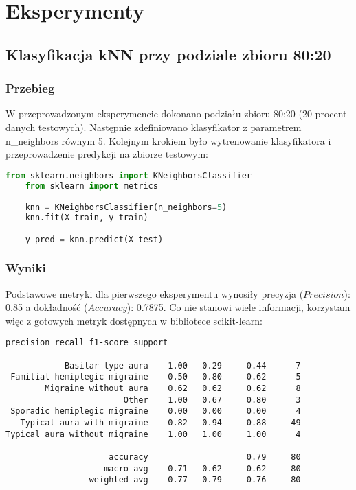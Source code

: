 \section{Eksperymenty}
\subsection{Klasyfikacja kNN przy podziale zbioru 80:20}
\subsubsection{Przebieg}
W przeprowadzonym eksperymencie dokonano podziału zbioru 80:20 (20 procent danych testowych). Następnie zdefiniowano klasyfikator z parametrem n\_neighbors równym 5. Kolejnym krokiem było wytrenowanie klasyfikatora i przeprowadzenie predykcji na zbiorze testowym:\\

\begin{lstlisting}[language=Python, caption=Definicja i uzycie kNN]
    from sklearn.neighbors import KNeighborsClassifier
    from sklearn import metrics

    knn = KNeighborsClassifier(n_neighbors=5)
    knn.fit(X_train, y_train)

    y_pred = knn.predict(X_test)
\end{lstlisting}

\subsubsection{Wyniki}
Podstawowe metryki dla pierwszego eksperymentu wynosiły precyzja ($Precision$): 0.85 a dokładność ($Accuracy$): 0.7875. Co nie stanowi wiele informacji, korzystam więc z gotowych metryk dostępnych w bibliotece scikit-learn:\\

\begin{lstlisting}[caption=Szczegółowa tabela walidacji]
                            precision recall f1-score support

            Basilar-type aura    1.00   0.29     0.44      7
 Familial hemiplegic migraine    0.50   0.80     0.62      5
        Migraine without aura    0.62   0.62     0.62      8
                        Other    1.00   0.67     0.80      3
 Sporadic hemiplegic migraine    0.00   0.00     0.00      4
   Typical aura with migraine    0.82   0.94     0.88     49
Typical aura without migraine    1.00   1.00     1.00      4

                     accuracy                    0.79     80
                    macro avg    0.71   0.62     0.62     80
                 weighted avg    0.77   0.79     0.76     80
\end{lstlisting}

